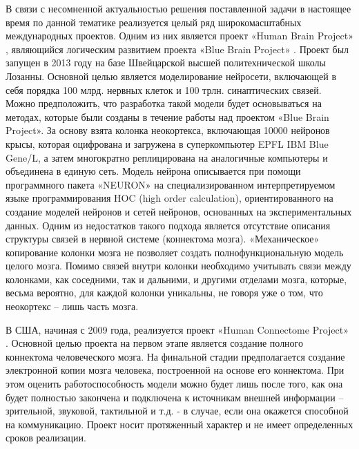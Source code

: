 В связи с несомненной актуальностью решения поставленной задачи в настоящее время по данной тематике реализуется целый ряд широкомасштабных международных проектов. Одним из них является проект «Human Brain Project» \cite{Markram2011}, являющийся логическим развитием проекта «Blue Brain Project» \cite{Markram2006}. Проект был запущен в 2013 году на базе Швейцарской высшей политехнической школы Лозанны. Основной целью является моделирование нейросети, включающей в себя порядка 100 млрд. нервных клеток и 100 трлн. синаптических связей. Можно предположить, что разработка такой модели будет основываться на методах, которые были созданы в течение работы над проектом «Blue Brain Project». За основу взята колонка неокортекса, включающая 10000 нейронов крысы, которая оцифрована и загружена в суперкомпьютер EPFL IBM Blue Gene/L, а затем многократно реплицирована на аналогичные компьютеры и объединена в единую сеть. Модель нейрона описывается при помощи программного пакета «NEURON» \cite{Carnevale2006} на специализированном интерпретируемом языке программирования HOC (high order calculation), ориентированного на создание моделей нейронов и сетей нейронов, основанных на экспериментальных данных. Одним из недостатков такого подхода является отсутствие описания структуры связей в нервной системе (коннектома мозга). «Механическое» копирование колонки мозга не позволяет создать полнофункциональную модель целого мозга. Помимо связей внутри колонки необходимо учитывать связи между колонками, как соседними, так и дальними, и другими отделами мозга, которые, весьма вероятно, для каждой колонки уникальны, не говоря уже о том, что неокортекс – лишь часть мозга.

В США, начиная с 2009 года, реализуется проект «Human Connectome Project» \cite{Elam2013}. Основной целью проекта на первом этапе является создание полного коннектома человеческого мозга. На финальной стадии предполагается создание электронной копии мозга человека, построенной на основе его коннектома. При этом оценить работоспособность модели можно будет лишь после того, как она будет полностью закончена и подключена к источникам внешней информации – зрительной, звуковой, тактильной и т.д. - в случае, если она окажется способной на коммуникацию. Проект носит протяженный характер и не имеет определенных сроков реализации.

